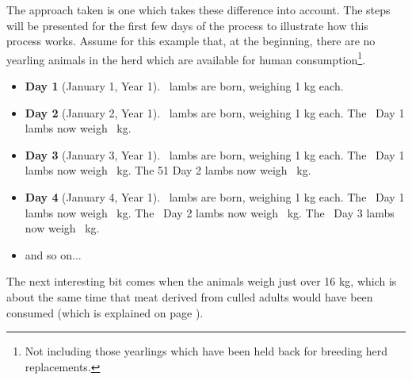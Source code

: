 The approach taken is one which takes these difference into account.  The steps will be presented for the first few days of the process to illustrate how this process works.  Assume for this example that, at the beginning, there are no yearling animals in the herd which are available for human consumption\footnote{Not including those yearlings which have been held back for breeding herd replacements.}.

\begin{itemize}
  \item \textbf{Day 1} (January 1, Year 1).
    \subitem \lambsBornPerDay\ lambs are born, weighing 1 kg each.
  \item \textbf{Day 2} (January 2, Year 1).
    \subitem \lambsBornPerDay\ lambs are born, weighing 1 kg each.  
    \subitem The \lambsBornPerDay\ Day 1 lambs now weigh \dayOneWeight\ kg.
  \item \textbf{Day 3} (January 3, Year 1).
    \subitem \lambsBornPerDay\ lambs are born, weighing 1 kg each.  
    \subitem The \lambsBornPerDay\ Day 1 lambs now weigh \dayTwoWeight\ kg.  
    \subitem The 51 Day 2 lambs now weigh \dayOneWeight\ kg.
  \item \textbf{Day 4} (January 4, Year 1).
    \subitem \lambsBornPerDay\ lambs are born, weighing 1 kg each.  
    \subitem The \lambsBornPerDay\ Day 1 lambs now weigh \dayThreeWeight\ kg.  
    \subitem The \lambsBornPerDay\ Day 2 lambs now weigh \dayTwoWeight\ kg.
    \subitem The \lambsBornPerDay\ Day 3 lambs now weigh \dayOneWeight\ kg.
  \item and so on...
\end{itemize}

The next interesting bit %
comes when the animals weigh just over 16 kg, which is about the same time that meat derived from culled adults would have been consumed (which is explained on page \pageref{startToEatOffspring}).%

